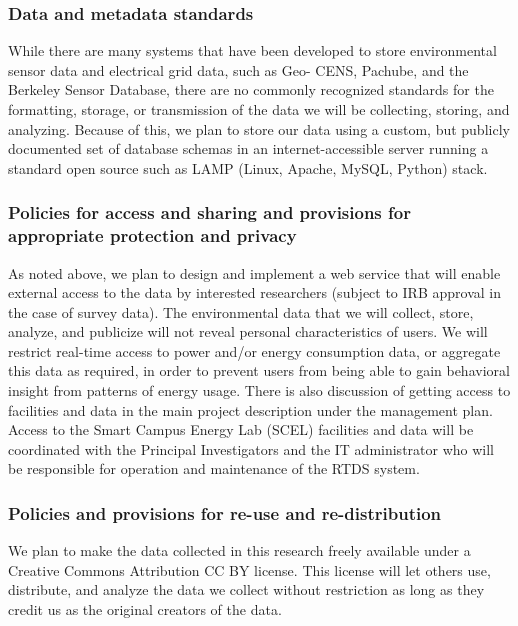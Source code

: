 \subsubsection*{Data and metadata standards}

While there are many systems that have been developed to store environmental sensor data and electrical grid data, such as Geo- CENS, Pachube, and the Berkeley Sensor Database, there are no commonly recognized standards for the formatting, storage, or transmission of the data we will be collecting, storing, and analyzing. Because of this, we plan to store our data using a custom, but publicly documented set of database schemas in an internet-accessible server running a standard open source such as LAMP (Linux, Apache, MySQL, Python) stack. 

\subsubsection*{Policies for access and sharing and provisions for appropriate protection and privacy}

As noted above, we plan to design and implement a web service that will enable external access to the data by interested researchers (subject to IRB approval in the case of survey data). The environmental data that we will collect, store, analyze, and publicize will not reveal personal characteristics of users. We will restrict real-time access to power and/or energy consumption data, or aggregate this data as required, in order to prevent users from being able to gain behavioral insight from patterns of energy usage.  
There is also discussion of getting access to facilities and data in the main project description under the management plan.  Access to the Smart Campus Energy Lab (SCEL) facilities and data will be coordinated with the Principal Investigators and the IT administrator who will be responsible for operation and maintenance of the RTDS system.

\subsubsection*{Policies and provisions for re-use and re-distribution}

We plan to make the data collected in this research freely available under a Creative Commons Attribution CC BY license. This license will let others use, distribute, and analyze the data we collect without restriction as long as they credit us as the original creators of the data.

